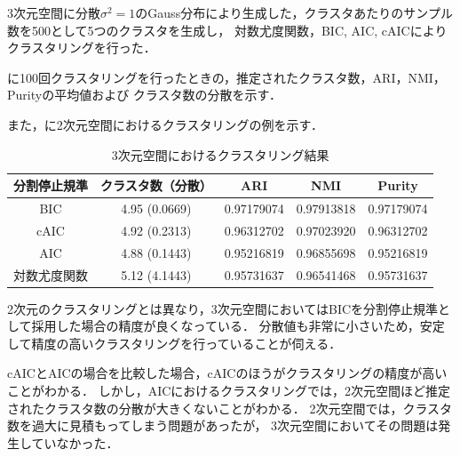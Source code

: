 3次元空間に分散$\sigma^2=1$のGauss分布により生成した，クラスタあたりのサンプル数を500として5つのクラスタを生成し，
対数尤度関数，BIC, AIC, cAICによりクラスタリングを行った．

に100回クラスタリングを行ったときの，推定されたクラスタ数，ARI，NMI，Purityの平均値および
クラスタ数の分散を示す．

また，に2次元空間におけるクラスタリングの例を示す．

\begin{table}[htb]
  \centering
  \caption{3次元空間におけるクラスタリング結果}
  \label{table:3dim}
  \begin{tabular}{|c|c|c|c|c|} \hline
    分割停止規準 & クラスタ数（分散） & ARI & NMI & Purity \\\hline
    BIC & 4.95 (0.0669) & 0.97179074 & 0.97913818 & 0.97179074\\
    cAIC & 4.92 (0.2313) & 0.96312702 & 0.97023920 & 0.96312702\\
    AIC & 4.88 (0.1443) & 0.95216819 & 0.96855698 & 0.95216819\\
    対数尤度関数 & 5.12 (4.1443) & 0.95731637 & 0.96541468 & 0.95731637\\\hline 
  \end{tabular}
\end{table}

2次元のクラスタリングとは異なり，3次元空間においてはBICを分割停止規準として採用した場合の精度が良くなっている．
分散値も非常に小さいため，安定して精度の高いクラスタリングを行っていることが伺える．

cAICとAICの場合を比較した場合，cAICのほうがクラスタリングの精度が高いことがわかる．
しかし，AICにおけるクラスタリングでは，2次元空間ほど推定されたクラスタ数の分散が大きくないことがわかる．
2次元空間では，クラスタ数を過大に見積もってしまう問題があったが，
3次元空間においてその問題は発生していなかった．

